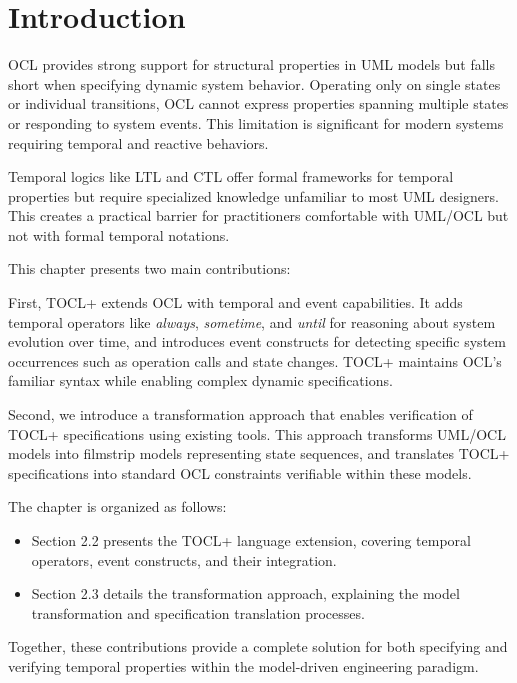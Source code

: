 \section{Introduction}

\hspace{1cm} OCL provides strong support for structural properties in UML models but 
falls short when specifying dynamic system behavior. Operating only on single states 
or individual transitions, OCL cannot express properties spanning multiple states or 
responding to system events. This limitation is significant for modern systems 
requiring temporal and reactive behaviors.

Temporal logics like LTL and CTL offer formal frameworks for temporal properties but 
require specialized knowledge unfamiliar to most UML designers. This creates a practical 
barrier for practitioners comfortable with UML/OCL but not with formal temporal notations.

This chapter presents two main contributions:

First, TOCL+ extends OCL with temporal and event capabilities. It adds temporal operators like \textit{always}, \textit{sometime}, and \textit{until} for reasoning about system evolution over time, and introduces event constructs for detecting specific system occurrences such as operation calls and state changes. TOCL+ maintains OCL's familiar syntax while enabling complex dynamic specifications.

Second, we introduce a transformation approach that enables verification of TOCL+ specifications using existing tools. This approach transforms UML/OCL models into filmstrip models representing state sequences, and translates TOCL+ specifications into standard OCL constraints verifiable within these models.

The chapter is organized as follows:
\begin{itemize}
    \item Section 2.2 presents the TOCL+ language extension, covering temporal operators, event constructs, and their integration.
    
    \item Section 2.3 details the transformation approach, explaining the model transformation and specification translation processes.
\end{itemize}

Together, these contributions provide a complete solution for both specifying and verifying temporal properties within the model-driven engineering paradigm.